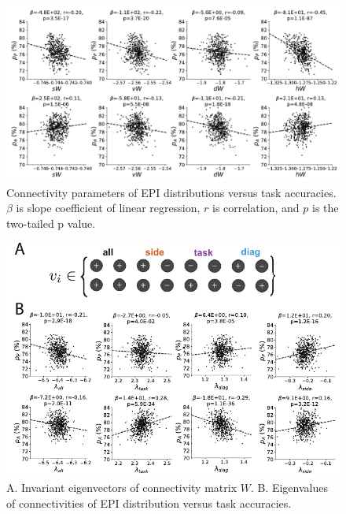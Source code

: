 \documentclass[11pt]{article}
\begin{document}
\begin{figure}
\begin{center}
\includegraphics[scale=0.85]{figs/figSX1.pdf}
\end{center}
\caption{\small Connectivity parameters of EPI distributions versus task accuracies.  $\beta$ is slope coefficient of linear regression, $r$ is correlation, and $p$ is the two-tailed p value.
}
\label{fig:SX1}
\end{figure}

\begin{figure}
\begin{center}
\includegraphics[scale=1.3]{figs/figSX2.pdf}
\end{center}
\caption{\small 
A. Invariant eigenvectors of connectivity matrix $W$.
B. Eigenvalues of connectivities of EPI distribution versus task accuracies.}
\label{fig:SX2}
\end{figure}
\end{document}

